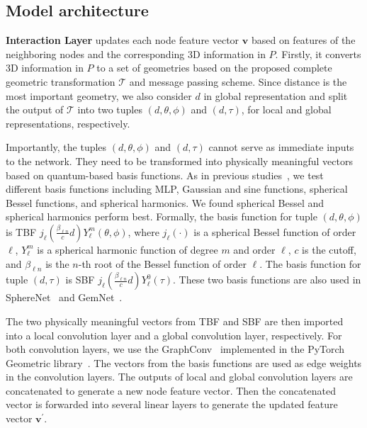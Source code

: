 \documentclass{article}
\begin{document}
\subsection{Model architecture} \label{sec:model architecture}

\textbf{Interaction Layer} updates each node feature vector $\textbf{v}$ based on features of the neighboring nodes and the corresponding 3D information in $P$. 
Firstly, it converts 3D information in $P$ to a set of geometries
based on the proposed complete geometric transformation $\mathcal{T}$ and message passing scheme.
Since distance is the most important geometry, we also consider $d$ in global representation and split the output of $\mathcal{T}$ into two tuples $(d,\theta,\phi)$ and $(d,\tau)$,
for local and global representations, respectively.

Importantly, the tuples $(d,\theta,\phi)$ and $(d,\tau)$ cannot serve as immediate inputs to the network.
They need to be transformed into physically meaningful vectors based on quantum-based basis functions.
As in previous studies~\cite{hu2021forcenet,klicpera_dimenet_2020,liu2022spherical,klicpera2021gemnet}, we test different basis functions including MLP, Gaussian and sine functions, spherical Bessel functions, and spherical harmonics. We found spherical Bessel and spherical harmonics perform best.
Formally, the basis function for tuple $(d,\theta,\phi)$ is TBF $j_{\ell}\left(\frac{\beta_{\ell n}}{c}d\right)Y_{\ell}^{m}(\theta, \phi)$,
where $j_{\ell}(\cdot)$ is a spherical Bessel function of order $\ell$,
$Y_{\ell}^{m}$ is a spherical harmonic function of degree $m$ and order $\ell$,
$c$ is the cutoff,
and $\beta_{\ell n}$ is the $n$-th root of the Bessel function of order $\ell$. 
The basis function for tuple $(d,\tau)$ is SBF $j_{\ell}\left(\frac{\beta_{\ell n}}{c}d\right)Y_{\ell}^{0}(\tau)$.
These two basis functions are also used in SphereNet~\cite{liu2022spherical} and GemNet~\cite{klicpera2021gemnet}.

The two physically meaningful vectors from TBF and SBF are then imported into
a local convolution layer and a global convolution layer, respectively.
For both convolution layers, we use the GraphConv~\cite{morris2019weisfeiler} implemented in the PyTorch Geometric library~\cite{Fey/Lenssen/2019}.
The vectors from the basis functions are used as edge weights in the convolution layers.
The outputs of local and global convolution layers are concatenated to generate a new node feature vector. 
Then the concatenated vector is forwarded into several linear layers to generate the updated
feature vector $\textbf{v}^\prime$.
\end{document}
